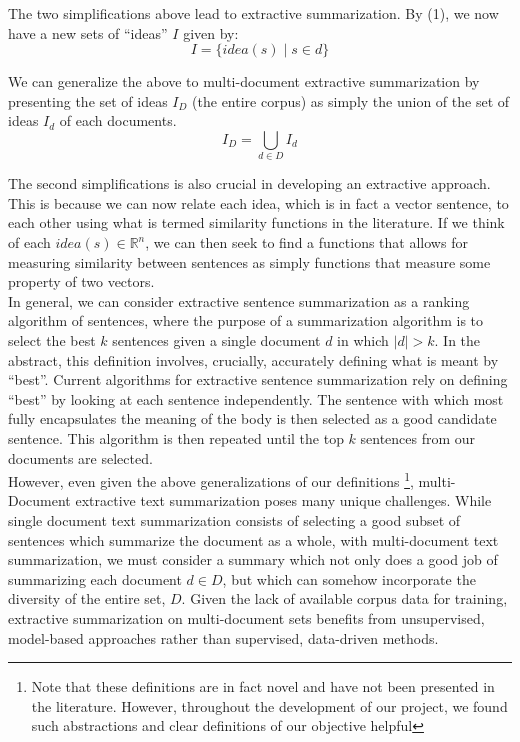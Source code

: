 \documentclass[10pt]{article}
\begin{document}
The two simplifications above lead to extractive summarization. By (1), we now have a new sets of ``ideas'' $I$ given by:
$$
I = \{idea(s) \mid s \in d \}
$$

We can generalize the above to multi-document extractive summarization by presenting the set of ideas $I_D$ (the entire corpus) as simply the union of the set of ideas $I_d$ of each documents.
$$
I_D = \bigcup_{d \in D} I_d
$$

The second simplifications is also crucial in developing an extractive approach. This is because we can now relate each idea, which is in fact a vector sentence, to each other using what is termed similarity functions in the literature. If we think of each $idea(s) \in \mathbb{R}^n$, we can then seek to find a functions that allows for measuring similarity between sentences as simply functions that measure some property of two vectors. \\

In general, we can consider extractive sentence summarization as a ranking algorithm of sentences, where the purpose of a summarization algorithm is to select the best $k$ sentences given a single document $d$ in which $|d| > k$. In the abstract, this definition involves, crucially, accurately defining what is meant by ``best''. Current algorithms for extractive sentence summarization rely on defining ``best'' by looking at each sentence independently. The sentence with which most fully encapsulates the meaning of the body is then selected as a good candidate sentence. This algorithm is then repeated until the top $k$ sentences from our documents are selected.\\

However, even given the above generalizations of our definitions \footnote{Note that these definitions are in fact novel and have not been presented in the literature. However, throughout the development of our project, we found such abstractions and clear definitions of our objective helpful}, multi-Document extractive text summarization poses many unique challenges. While single document text summarization consists of selecting a good subset of sentences which summarize the document as a whole, with multi-document text summarization, we must consider a summary which not only does a good job of summarizing each document $d \in D$, but which can somehow incorporate the diversity of the entire set, $D$. Given the lack of available corpus data for training, extractive summarization on multi-document sets benefits from unsupervised, model-based approaches rather than supervised, data-driven methods. \\
\end{document}

